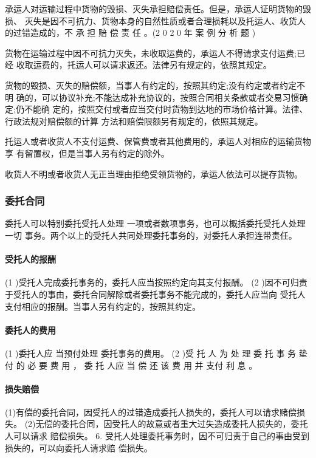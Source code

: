 \documentclass[UTF8,12pt]{ctexart}
\numberwithin{equation}{section} %
\numberwithin{figure}{section}
\numberwithin{table}{section}
\begin{document}
	承运人对运输过程中货物的毁损、灭失承担赔偿责任。但是，承运人证明货物的毁损、 灭失是因不可抗力、货物本身的自然性质或者合理损耗以及托运人、收货人的过错造成的，不 承 担 赔 偿 责 任 。(2 0 2 0 年 案 例 分 析 题 )
	
	货物在运输过程中因不可抗力灭失，未收取运费的，承运人不得请求支付运费;已经 收取运费的，托运人可以请求返还。法律另有规定的，依照其规定。
	
	货物的毁损、灭失的赔偿额，当事人有约定的，按照其约定;没有约定或者约定不明 确的，可以协议补充;不能达成补充协议的，按照合同相关条款或者交易习惯确定;仍不能确 定的，按照交付或者应当交付时货物到达地的市场价格计算。法律、行政法规对赔偿额的计算 方法和赔偿限额另有规定的，依照其规定。
	
	托运人或者收货人不支付运费、保管费或者其他费用的，承运人对相应的运输货物享 有留置权，但是当事人另有约定的除外。
	
	收货人不明或者收货人无正当理由拒绝受领货物的，承运人依法可以提存货物。
	
	
	\subsubsection{委托合同}
	委托人可以特别委托受托人处理 一项或者数项事务，也可以概括委托受托人处理一切 事务。两个以上的受托人共同处理委托事务的，对委托人承担连带责任。
	\paragraph{受托人的报酬}
	(1 )受托人完成委托事务的，委托人应当按照约定向其支付报酬。
	(2 )因不可归责于受托人的事由，委托合同解除或者委托事务不能完成的，委托人应当向 受托人支付相应的报酬。当事人另有约定的，按照其约定。
	
	\paragraph{委托人的费用}
	(1 )委托人应 当预付处理 委托事务的费用。
	(2 )受 托 人 为 处 理 委 托 事 务 垫 付 的 必 要 费 用 ， 委 托 人应 当 偿 还 该 费 用 并 支付 利 息 。
	
	\paragraph{损失赔偿} (1)有偿的委托合同，因受托人的过错造成委托人损失的，委托人可以请求赌偿损失。 (2)无偿的委托合同，因受托人的故意或者重大过失造成委托人损失的，委托人可以请求 赔偿损失。
	6. 受托人处理委托事务时，因不可归责于自己的事由受到损失的，可以向委托人请求赔 偿损失。
	
\end{document}
